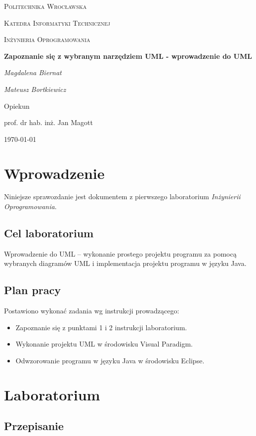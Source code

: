 \documentclass{article}
\begin{document}
\begin{titlepage}
\centering
{\scshape\LARGE Politechnika Wrocławska \par}
{\scshape\Large Katedra Informatyki Technicznej\par}

	\vspace{1cm}
	{\scshape\Large Inżynieria Oprogramowania\par}
	\vspace{1.5cm}
	{\huge\bfseries Zapoznanie się z wybranym narzędziem UML - wprowadzenie do UML\par}
	\vspace{2cm}
	{\Large\itshape Magdalena Biernat\par}
	{\Large\itshape Mateusz Bortkiewicz\par}
	\vfill
	Opiekun\par
	prof. dr hab. inż. Jan Magott 

	\vfill
	{\large \today\par}
\end{titlepage}
\newpage
\section{Wprowadzenie}
Niniejsze sprawozdanie jest dokumentem z pierwszego laboratorium \textit{Inżynierii Oprogramowania}.
\subsection{Cel laboratorium}
Wprowadzenie do UML – wykonanie prostego projektu programu za pomocą
wybranych diagramów UML i implementacja projektu programu w języku
Java.
\subsection{Plan pracy}
Postawiono wykonać zadania wg instrukcji prowadzącego:
\begin{itemize}
\item Zapoznanie się z punktami 1 i 2 instrukcji laboratorium.
\item Wykonanie projektu UML w środowisku Visual Paradigm.
\item Odwzorowanie programu w języku Java w środowisku Eclipse.
\end{itemize}
\section{Laboratorium}
\subsection{Przepisanie}
\end{document}
